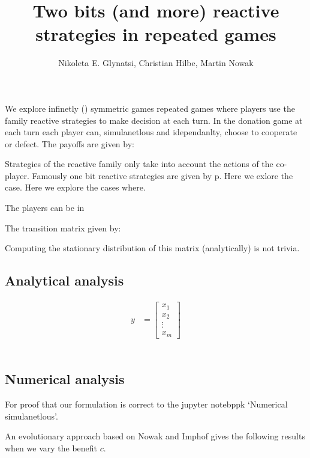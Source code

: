 \documentclass{article}
\title{Two bits (and more) reactive strategies in repeated games}
\author{Nikoleta E. Glynatsi, Christian Hilbe, Martin Nowak}
\date{}
\begin{document}
We explore infinetly () symmetric games repeated games where players use
the family reactive strategies to make decision at each turn. In the donation
game at each turn each player can, simulanetlous and idependanlty, choose
to cooperate or defect. The payoffs are given by:


Strategies of the reactive family only take into account the actions of the co-player.
Famously one bit reactive strategies are given by p. Here we exlore the case.
Here we explore the cases where. 

The players can be in 


The transition matrix given by: 

Computing the stationary distribution of this matrix (analytically) is not
trivia.

\subsection{Analytical analysis}


\begin{align}
  y &= \begin{bmatrix}
         x_{1} \\
         x_{2} \\
         \vdots \\
         x_{m}
       \end{bmatrix}
\end{align}


\begin{align}
[   &  p_{1}^{2} q_{1}^{2} \\
    &  p_{1}^{2} q_{1} \left(1 -q_{1}\right) \\
    &  p_{1} q_{1}^{2} \left(1 - p_{1}\right) \\ 
    &  p_{1} q_{1} \left(p_{1} -1\right) \left(q_{1} - 1\right) \\
    &  p_{1}^{2} q_{1} \left(1 -q_{1}\right) \\
    &  p_{1}^{2} \left(q_{1} - 1\right)^{2}\\
    &  p_{1} q_{1} \left(p_{1} - 1\right) \left(q_{1} - 1\right)\\
    &  - p_{1} \left(p_{1} - 1\right) \left(q_{1} - 1\right)^{2}\\
    & p_{1} q_{1}^{2} \left(1 - p_{1}\right)\\
    & p_{1} q_{1} \left(p_{1} - 1\right) \left(q_{1} - 1\right)\\
    & q_{1}^{2} \left(p_{1} - 1\right)^{2} \\
    & - q_{1}\left(p_{1} - 1\right)^{2} \left(q_{1} - 1\right)\\
    & p_{1} q_{1} \left(p_{1} - 1\right) \left(q_{1} - 1\right)\\
    & - p_{1} \left(p_{1} - 1\right) \left(q_{1} - 1\right)^{2}\\
    & - q_{1} \left(p_{1} - 1\right)^{2} \left(q_{1} - 1\right)\\
    & \left(p_{1} - 1\right)^{2} \left(q_{1} - 1\right)^{2}]
\end{align}


\subsection{Numerical analysis}

For proof that our formulation is correct to the jupyter notebppk `Numerical
simulanetlous'.

An evolutionary approach based on Nowak and Imphof gives the following
results when we vary the benefit \(c\).
\end{document}
